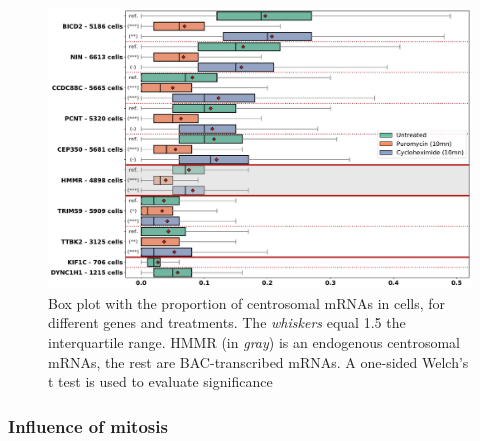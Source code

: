 \begin{figure}[h]
    \centering
    \includegraphics[width=\textwidth]{figures/chapter5/plot_rna_centrosome}
    \caption{Box plot with the proportion of centrosomal mRNAs in cells, for different genes and treatments.
	The \textit{whiskers} equal 1.5 the interquartile range.
	HMMR (in \textit{gray}) is an endogenous centrosomal mRNAs, the rest are BAC-transcribed mRNAs.
	A one-sided Welch’s t test is used to evaluate significance}
    \label{fig:plot_rna_centrosome}
\end{figure}


\subsubsection{Influence of mitosis}


